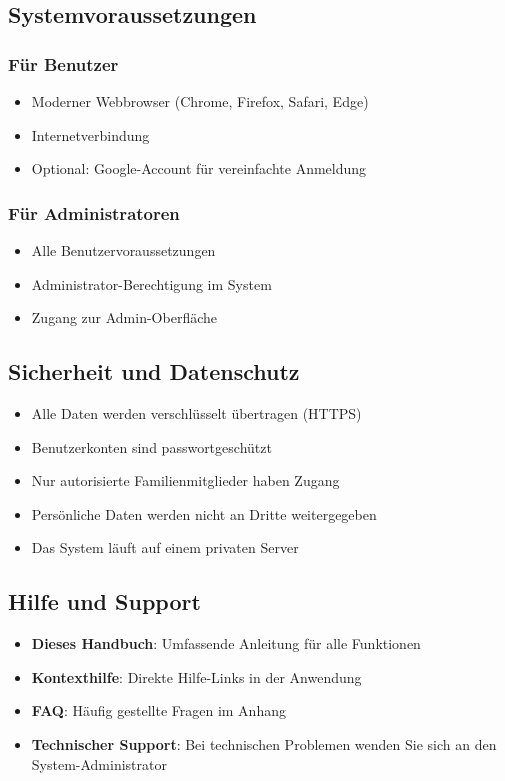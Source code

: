 \subsection{Systemvoraussetzungen}

\subsubsection{Für Benutzer}
\begin{itemize}
    \item Moderner Webbrowser (Chrome, Firefox, Safari, Edge)
    \item Internetverbindung
    \item Optional: Google-Account für vereinfachte Anmeldung
\end{itemize}

\subsubsection{Für Administratoren}
\begin{itemize}
    \item Alle Benutzervoraussetzungen
    \item Administrator-Berechtigung im System
    \item Zugang zur Admin-Oberfläche
\end{itemize}

\subsection{Sicherheit und Datenschutz}

\begin{itemize}
    \item Alle Daten werden verschlüsselt übertragen (HTTPS)
    \item Benutzerkonten sind passwortgeschützt
    \item Nur autorisierte Familienmitglieder haben Zugang
    \item Persönliche Daten werden nicht an Dritte weitergegeben
    \item Das System läuft auf einem privaten Server
\end{itemize}

\subsection{Hilfe und Support}

\begin{itemize}
    \item \textbf{Dieses Handbuch}: Umfassende Anleitung für alle Funktionen
    \item \textbf{Kontexthilfe}: Direkte Hilfe-Links in der Anwendung
    \item \textbf{FAQ}: Häufig gestellte Fragen im Anhang
    \item \textbf{Technischer Support}: Bei technischen Problemen wenden Sie sich an den System-Administrator
\end{itemize}

\newpage